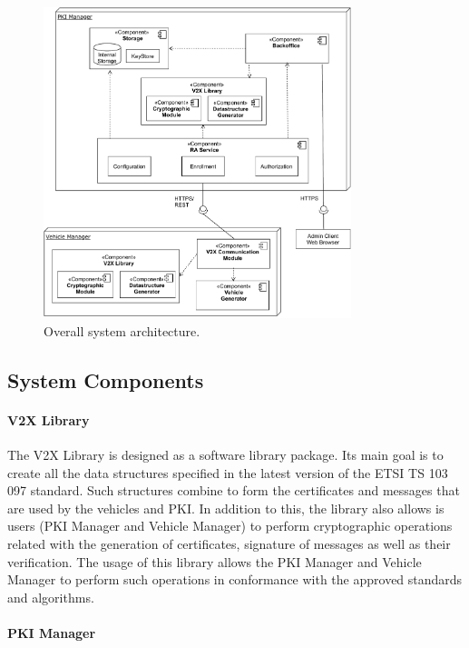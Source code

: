 \begin{figure}[t]
	\centering
	\includegraphics[width=0.8\textwidth]{Figures/architecture2}
	\caption{\label{fig:system_arch}Overall system architecture.}
\end{figure}

\subsection{System Components}

\paragraph{V2X Library}
\label{section:model}

The V2X Library is designed as a software library package. Its main goal is to create all the data structures specified in the latest version of the ETSI TS 103 097 standard. Such structures combine to form the certificates and messages that are used by the vehicles and PKI. In addition to this, the library also allows is users (PKI Manager and Vehicle Manager) to perform cryptographic operations related with the generation of certificates, signature of messages as well as their verification. The usage of this library allows the PKI Manager and Vehicle Manager to perform such operations in conformance with the approved standards and algorithms.

\paragraph{PKI Manager}
\label{section:model}


